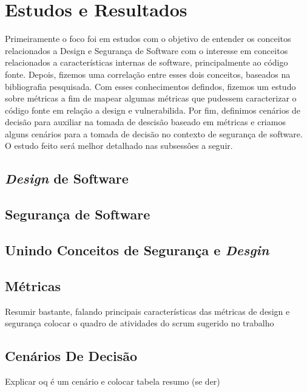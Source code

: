 \section{Estudos e Resultados}
\label{sec:studies}

Primeiramente o foco foi em estudos com o objetivo de entender os conceitos relacionados a Design e Segurança de Software com o interesse em conceitos relacionados a características internas de software, principalmente ao código fonte. Depois, fizemos uma correlação entre esses dois conceitos, baseados na bibliografia pesquisada. Com esses conhecimentos defindos, fizemos um estudo sobre métricas a fim de mapear algumas métricas que pudessem caracterizar o código fonte em relação a design e vulnerabilida. Por fim, definimos cenários de decisão para auxiliar na tomada de descisão baseado em métricas e criamos alguns cenários para a tomada de decisão no contexto de segurança de software. O estudo feito será melhor detalhado nas subsessôes a seguir.

\subsection{\emph{Design} de Software}    
\subsection{Segurança de Software}
\subsection{Unindo Conceitos de Segurança e \emph{Desgin}}
\subsection{Métricas}

Resumir bastante, falando principais características das métricas de design e segurança
colocar o quadro de atividades do scrum sugerido no trabalho

\subsection{Cenários De Decisão}
Explicar oq é um cenário e colocar tabela resumo (se der)


